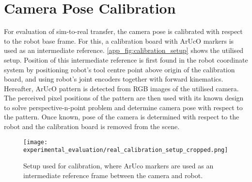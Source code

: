 \section{Camera Pose Calibration}\label{app:camera_pose_calibration}

For evaluation of sim-to-real transfer, the camera pose is calibrated with respect to the robot base frame. For this, a calibration board with ArUcO markers \cite{garrido-jurado_automatic_2014} is used as an intermediate reference. \autoref{app_fig:calibration_setup} shows the utilised setup. Position of this intermediate reference is first found in the robot coordinate system by positioning robot's tool centre point above origin of the calibration board, and using robot's joint encoders together with forward kinematics. Hereafter, ArUcO pattern is detected from RGB images of the utilised camera. The perceived pixel positions of the pattern are then used with its known design to solve perspective-n-point problem and determine camera pose with respect to the pattern. Once known, pose of the camera is determined with respect to the robot and the calibration board is removed from the scene.

\setcounter{figure}{0}
\begin{figure}[ht]
    \centering
    \texttt{[image: experimental\_evaluation/real\_calibration\_setup\_cropped.png]}
    \caption{Setup used for calibration, where ArUco markers are used as an intermediate reference frame between the camera and robot.}
    \label{app_fig:calibration_setup}
\end{figure}
